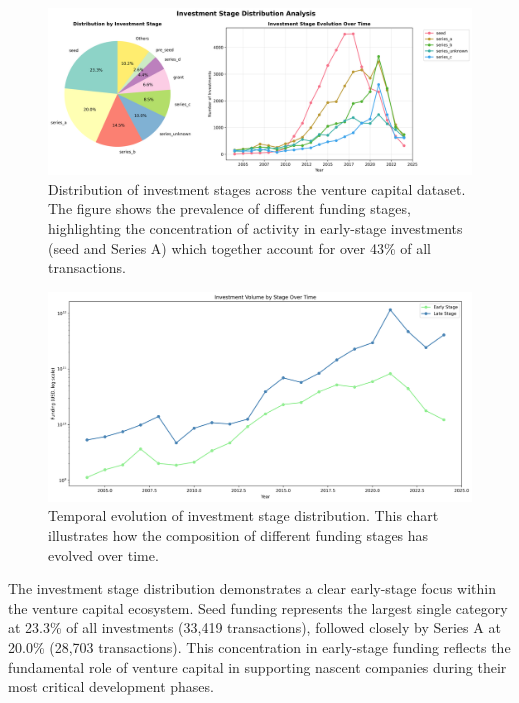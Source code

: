 \begin{figure}[htbp]
\centering
\includegraphics[width=1\textwidth]{../figures/us/investment_stage_distribution.png}
\caption{Distribution of investment stages across the venture capital dataset. The figure shows the prevalence of different funding stages, highlighting the concentration of activity in early-stage investments (seed and Series A) which together account for over 43\% of all transactions.}
\label{fig:investment_stage_dist}
\end{figure}

\begin{figure}[htbp]
\centering
\includegraphics[width=1\textwidth]{../figures/us/investment_stage_curves_log.png}
\caption{Temporal evolution of investment stage distribution. This chart illustrates how the composition of different funding stages has evolved over time.}
\label{fig:investment_stage_temporal}
\end{figure}

The investment stage distribution demonstrates a clear early-stage focus within the venture capital ecosystem. Seed funding represents the largest single category at 23.3\% of all investments (33,419 transactions), followed closely by Series A at 20.0\% (28,703 transactions). This concentration in early-stage funding reflects the fundamental role of venture capital in supporting nascent companies during their most critical development phases.

